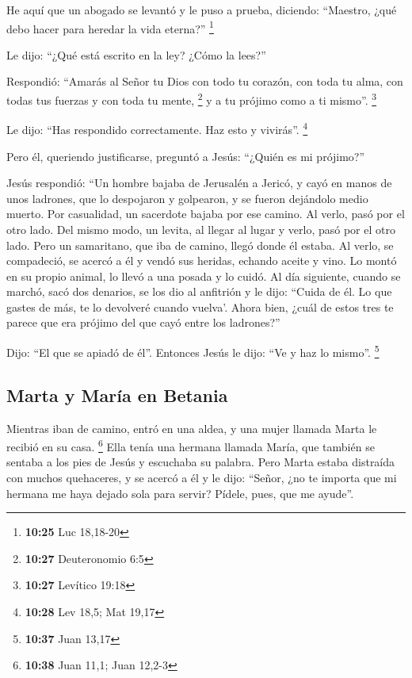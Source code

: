  He aquí que un abogado se levantó y le puso a prueba,
diciendo: ``Maestro, ¿qué debo hacer para heredar la vida eterna?''
\footnote{\textbf{10:25} Luc 18,18-20}

 Le dijo: ``¿Qué está escrito en la ley? ¿Cómo la lees?''

 Respondió: ``Amarás al Señor tu Dios con todo tu
corazón, con toda tu alma, con todas tus fuerzas y con toda tu mente,
\footnote{\textbf{10:27} Deuteronomio 6:5} y a tu prójimo como a ti
mismo''. \footnote{\textbf{10:27} Levítico 19:18}

 Le dijo: ``Has respondido correctamente. Haz esto y
vivirás''. \footnote{\textbf{10:28} Lev 18,5; Mat 19,17}

 Pero él, queriendo justificarse, preguntó a Jesús:
``¿Quién es mi prójimo?''

 Jesús respondió: ``Un hombre bajaba de Jerusalén a
Jericó, y cayó en manos de unos ladrones, que lo despojaron y golpearon,
y se fueron dejándolo medio muerto.  Por casualidad, un
sacerdote bajaba por ese camino. Al verlo, pasó por el otro lado.
 Del mismo modo, un levita, al llegar al lugar y verlo,
pasó por el otro lado.  Pero un samaritano, que iba de
camino, llegó donde él estaba. Al verlo, se compadeció, 
se acercó a él y vendó sus heridas, echando aceite y vino. Lo montó en
su propio animal, lo llevó a una posada y lo cuidó.  Al
día siguiente, cuando se marchó, sacó dos denarios, se los dio al
anfitrión y le dijo: ``Cuida de él. Lo que gastes de más, te lo
devolveré cuando vuelva'.  Ahora bien, ¿cuál de estos
tres te parece que era prójimo del que cayó entre los ladrones?''

 Dijo: ``El que se apiadó de él''. Entonces Jesús le
dijo: ``Ve y haz lo mismo''. \footnote{\textbf{10:37} Juan 13,17}

\hypertarget{marta-y-maruxeda-en-betania}{%
\subsection{Marta y María en
Betania}\label{marta-y-maruxeda-en-betania}}

 Mientras iban de camino, entró en una aldea, y una mujer
llamada Marta le recibió en su casa. \footnote{\textbf{10:38} Juan 11,1;
  Juan 12,2-3}  Ella tenía una hermana llamada María, que
también se sentaba a los pies de Jesús y escuchaba su palabra.
 Pero Marta estaba distraída con muchos quehaceres, y se
acercó a él y le dijo: ``Señor, ¿no te importa que mi hermana me haya
dejado sola para servir? Pídele, pues, que me ayude''.

